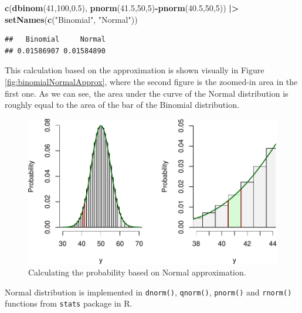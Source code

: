 \documentclass[
]{book}
\newenvironment{Shaded}{\begin{snugshade}}{\end{snugshade}}
\newcommand{\DecValTok}[1]{\textcolor[rgb]{0.00,0.00,0.81}{#1}}
\newcommand{\FloatTok}[1]{\textcolor[rgb]{0.00,0.00,0.81}{#1}}
\newcommand{\FunctionTok}[1]{\textcolor[rgb]{0.13,0.29,0.53}{\textbf{#1}}}
\newcommand{\NormalTok}[1]{#1}
\newcommand{\SpecialCharTok}[1]{\textcolor[rgb]{0.81,0.36,0.00}{\textbf{#1}}}
\newcommand{\StringTok}[1]{\textcolor[rgb]{0.31,0.60,0.02}{#1}}
\theoremstyle{definition}
\theoremstyle{definition}
\theoremstyle{definition}
\theoremstyle{definition}
\theoremstyle{remark}
\begin{document}
\begin{Shaded}
\begin{Highlighting}[]
\FunctionTok{c}\NormalTok{(}\FunctionTok{dbinom}\NormalTok{(}\DecValTok{41}\NormalTok{,}\DecValTok{100}\NormalTok{,}\FloatTok{0.5}\NormalTok{),}
  \FunctionTok{pnorm}\NormalTok{(}\FloatTok{41.5}\NormalTok{,}\DecValTok{50}\NormalTok{,}\DecValTok{5}\NormalTok{)}\SpecialCharTok{{-}}\FunctionTok{pnorm}\NormalTok{(}\FloatTok{40.5}\NormalTok{,}\DecValTok{50}\NormalTok{,}\DecValTok{5}\NormalTok{)) }\SpecialCharTok{|\textgreater{}}
    \FunctionTok{setNames}\NormalTok{(}\FunctionTok{c}\NormalTok{(}\StringTok{"Binomial"}\NormalTok{, }\StringTok{"Normal"}\NormalTok{))}
\end{Highlighting}
\end{Shaded}

\begin{verbatim}
##   Binomial     Normal 
## 0.01586907 0.01584890
\end{verbatim}

This calculation based on the approximation is shown visually in Figure \ref{fig:binomialNormalApprox}, where the second figure is the zoomed-in area in the first one. As we can see, the area under the curve of the Normal distribution is roughly equal to the area of the bar of the Binomial distribution.

\begin{figure}
\centering
\includegraphics{Svetunkov---Statistics-for-Business-Analytics_files/figure-latex/binomialNormalApproxArea-1.pdf}
\caption{\label{fig:binomialNormalApproxArea}Calculating the probability based on Normal approximation.}
\end{figure}

Normal distribution is implemented in \texttt{dnorm()}, \texttt{qnorm()}, \texttt{pnorm()} and \texttt{rnorm()} functions from \texttt{stats} package in R.
\end{document}
